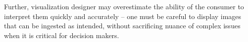 Further, visualization designer may overestimate the ability of the consumer to interpret them quickly and accurately -- one must be careful to display images that can be ingested as intended, without sacrificing nuance of complex issues when it is critical for decision makers\cite{Borner2019,Lupi2017,Zhang2019}. %

